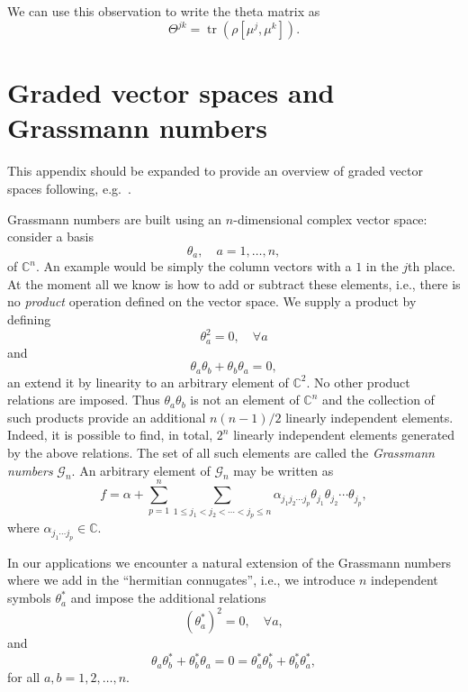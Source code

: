 \documentclass[prl,twocolumn,lengthcheck,superscriptaddress]{revtex4-1}
\newcommand{\tr}{\operatorname{tr}}
\theoremstyle{definition}
\theoremstyle{remark}
\begin{document}
We can use this observation to write the theta matrix as
\begin{equation}
	\Theta^{jk} = \tr(\rho [\mu^j, \mu^k]).
\end{equation}

\section{Graded vector spaces and Grassmann numbers}
{\color{red} This appendix should be expanded to provide an overview of graded vector spaces following, e.g.\ \cite{deligne:1999a}.}


Grassmann numbers are built using an $n$-dimensional complex vector space: consider a basis
\begin{equation}
	\theta_a, \quad a = 1, \ldots, n,
\end{equation}
of $\mathbb{C}^n$. An example would be simply the column vectors with a $1$ in the $j$th place. At the moment all we know is how to add or subtract these elements, i.e., there is no \emph{product} operation defined on the vector space. We supply a product by defining
\begin{equation}
	\theta_a^2 = 0, \quad \forall a
\end{equation}
and
\begin{equation}
	\theta_a\theta_b + \theta_b \theta_a = 0,
\end{equation}
an extend it by linearity to an arbitrary element of $\mathbb{C}^2$. No other product relations are imposed. Thus $\theta_a\theta_b$ is not an element of $\mathbb{C}^n$ and the collection of such products provide an additional $n(n-1)/2$  linearly independent elements. Indeed, it is possible to find, in total, $2^n$ linearly independent elements generated by the above relations. The set of all such elements are called the \emph{Grassmann numbers} $\mathcal{G}_n$. An arbitrary element of $\mathcal{G}_n$ may be written as 
\begin{equation}
	f = \alpha + \sum_{p=1}^n\sum_{1 \le j_1 < j_2 < \cdots < j_p \le n}\alpha_{j_1j_2\cdots j_p} \theta_{j_1}\theta_{j_2}\cdots \theta_{j_p},
\end{equation} 
where $\alpha_{j_1\cdots j_p} \in \mathbb{C}$.

In our applications we encounter a natural extension of the Grassmann numbers where we add in the ``hermitian connugates'', i.e., we introduce $n$ independent symbols $\theta_a^*$ and impose the additional relations
\begin{equation}
	(\theta_a^*)^2 = 0, \quad \forall a,
\end{equation}
and
\begin{equation}
	\theta_a\theta_b^* + \theta_b^* \theta_a = 0 = \theta_a^*\theta_b^* + \theta_b^* \theta_a^*,
\end{equation}
for all $a,b = 1,2, \ldots, n$.
\end{document}
